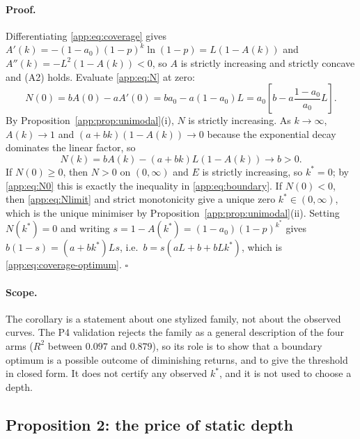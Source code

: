 \paragraph{Proof.} Differentiating \eqref{app:eq:coverage} gives
$A'(k)=-(1-a_{0})(1-p)^{k}\ln(1-p)=L\left(1-A(k)\right)$ and
$A''(k)=-L^{2}\left(1-A(k)\right)<0$, so $A$ is strictly increasing and strictly
concave and (A2) holds. Evaluate \eqref{app:eq:N} at zero:
\begin{equation}\label{app:eq:N0}
  N(0)=bA(0)-aA'(0)=ba_{0}-a(1-a_{0})L
  =a_{0}\left[b-a\frac{1-a_{0}}{a_{0}}L\right].
\end{equation}
By Proposition~\ref{app:prop:unimodal}(i), $N$ is strictly increasing. As
$k\to\infty$, $A(k)\to1$ and $(a+bk)(1-A(k))\to0$ because the exponential decay
dominates the linear factor, so
\begin{equation}\label{app:eq:Nlimit}
  N(k)=bA(k)-(a+bk)L\left(1-A(k)\right)\longrightarrow b>0 .
\end{equation}
If $N(0)\ge0$, then $N>0$ on $(0,\infty)$ and $E$ is strictly increasing, so
$k^{*}=0$; by \eqref{app:eq:N0} this is exactly the inequality in
\eqref{app:eq:boundary}. If $N(0)<0$, then \eqref{app:eq:Nlimit} and strict
monotonicity give a unique zero $k^{*}\in(0,\infty)$, which is the unique
minimiser by Proposition~\ref{app:prop:unimodal}(ii). Setting $N(k^{*})=0$ and
writing $s=1-A(k^{*})=(1-a_{0})(1-p)^{k^{*}}$ gives
$b(1-s)=(a+bk^{*})Ls$, i.e.\ $b=s\left(aL+b+bLk^{*}\right)$, which is
\eqref{app:eq:coverage-optimum}. \hfill$\square$

\paragraph{Scope.} The corollary is a statement about one stylized family, not
about the observed curves. The P4 validation rejects the family as a general
description of the four arms ($R^{2}$ between $0.097$ and $0.879$), so its role
is to show that a boundary optimum is a possible outcome of diminishing returns,
and to give the threshold in closed form. It does not certify any observed
$k^{*}$, and it is not used to choose a depth.

\subsection{Proposition 2: the price of static depth}\label{app:prop:price}

